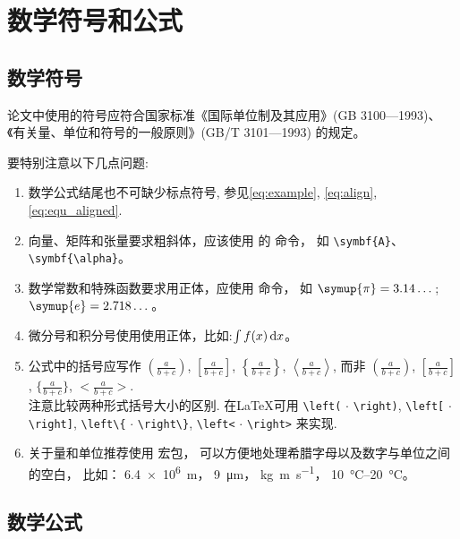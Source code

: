 
\chapter{数学符号和公式}\label{equations}

\section{数学符号}

论文中使用的符号应符合国家标准《国际单位制及其应用》(GB 3100—1993)、《有关量、单位和符号的一般原则》(GB/T 3101—1993) 的规定。

要特别注意以下几点问题:

\begin{enumerate}
\item 数学公式结尾也不可缺少标点符号, 参见\eqref{eq:example}, \eqref{eq:align}, \eqref{eq:equ_aligned}.
    \item 向量、矩阵和张量要求粗斜体，应该使用  的  命令，
          如 \verb|\symbf{A}|、\verb|\symbf{\alpha}|。
    \item 数学常数和特殊函数要求用正体，应使用  命令，
    如 $\symup{\pi} = 3.14\dots$; $\symup{e} = 2.718\dots$。
    \item 微分号和积分号使用使用正体，比如:$\int f(x) \mathop{}\!\mathrm{d} x$。
    \item 公式中的括号应写作 $\displaystyle \left(\frac{a}{b + c}\right)$, $\displaystyle \left[\frac{a}{b + c}\right]$, $\displaystyle \left\{\frac{a}{b + c}\right\}$, $\displaystyle \left<\frac{a}{b + c}\right>$, 而非 $\displaystyle (\frac{a}{b + c})$, $\displaystyle [\frac{a}{b + c}]$, $\displaystyle \{\frac{a}{b + c}\}$, $\displaystyle <\frac{a}{b + c}>$.\\
    注意比较两种形式括号大小的区别. 在\LaTeX{}可用 \verb|\left(| $\cdot$ \verb|\right)|, \verb|\left[| $\cdot$ \verb|\right]|, \verb|\left\{| $\cdot$ \verb|\right\}|, \verb|\left<| $\cdot$ \verb|\right>| 来实现.
    \item 关于量和单位推荐使用\href{http://mirrors.ctan.org/macros/latex/contrib/siunitx/siunitx.pdf}{}
宏包，
        可以方便地处理希腊字母以及数字与单位之间的空白，
        比如：
        \SI{6.4e6}{m}，
        \SI{9}{\micro\meter}，
        \si{kg.m.s^{-1}}，
        \SIrange{10}{20}{\degreeCelsius}。
\end{enumerate}

\section{数学公式}

